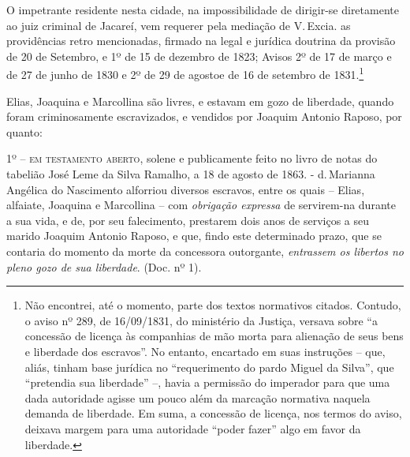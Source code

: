 O impetrante residente nesta cidade, na impossibilidade de dirigir-se
diretamente ao juiz criminal de Jacareí, vem requerer pela mediação de
V.\,Excia. as providências retro mencionadas, firmado na legal e jurídica
doutrina da provisão de 20 de Setembro, e 1º de 15 de dezembro de 1823;
Avisos 2º de 17 de março e de 27 de junho de 1830 e 2º de 29 de agostoe
de 16 de setembro de 1831.\footnote{ Não encontrei, até o momento,
  parte dos textos normativos citados. Contudo, o aviso nº 289, de
  16/09/1831, do ministério da Justiça, versava sobre ``a concessão de
  licença às companhias de mão morta para alienação de seus bens e
  liberdade dos escravos''. No entanto, encartado em suas instruções --
  que, aliás, tinham base jurídica no ``requerimento do pardo Miguel da
  Silva'', que ``pretendia sua liberdade'' --, havia a permissão do
  imperador para que uma dada autoridade agisse um pouco além da
  marcação normativa naquela demanda de liberdade. Em suma, a concessão
  de licença, nos termos do aviso, deixava margem para uma autoridade
  ``poder fazer'' algo em favor da liberdade.}

Elias, Joaquina e Marcollina são livres, e estavam em gozo de liberdade,
quando foram criminosamente escravizados, e vendidos por Joaquim Antonio
Raposo, por quanto:

1º -- \textsc{em testamento aberto}, solene e publicamente feito no livro de
notas do tabelião José Leme da Silva Ramalho, a 18 de agosto de 1863. -
d.\,Marianna Angélica do Nascimento alforriou diversos escravos, entre os
quais -- Elias, alfaiate, Joaquina e Marcollina -- com \emph{obrigação
expressa} de servirem-na durante a sua vida, e de, por seu falecimento,
prestarem dois anos de serviços a seu marido Joaquim Antonio Raposo, e
que, findo este determinado prazo, que se contaria do momento da morte
da concessora outorgante, \emph{entrassem os libertos no pleno gozo de
sua liberdade}. (Doc. nº 1).

